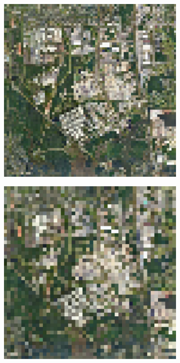 \begin{figure}[H]
    \begin{subfigure}[b]{0.3\textwidth}
        \includegraphics[width=\textwidth]{4.Payload/HoustonGSD100.jpg}
    \end{subfigure}
    \hfill
    \begin{subfigure}[b]{0.3\textwidth}
        \includegraphics[width=\textwidth]{4.Payload/Houston GSD150.jpg}

\end{subfigure}
\end{figure}
